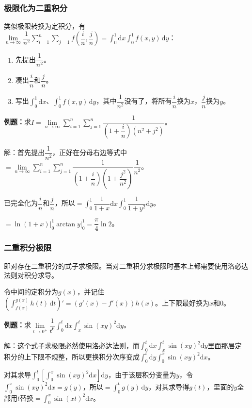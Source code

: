 \documentclass[UTF8, 12pt]{ctexart}
\begin{document}
\subsubsection{极限化为二重积分}

类似极限转换为定积分，有$\lim\limits_{n\to\infty}\dfrac{1}{n^2}\sum\limits_{i=1}^n\sum\limits_{j=1}f\left(\dfrac{i}{n},\dfrac{j}{n}\right)=\int_0^1\textrm{d}x\int_0^1f(x,y)\,\textrm{d}y$：

\begin{enumerate}
    \item 先提出$\dfrac{1}{n^2}$。
    \item 凑出$\dfrac{i}{n}$和$\dfrac{j}{n}$。
    \item 写出$\int_0^1\textrm{d}x$、$\int_0^1f(x,y)\,\textrm{d}y$，其中$\dfrac{1}{n^2}$没有了，将所有$\dfrac{i}{n}$换为$x$，$\dfrac{j}{n}$换为$y$。
\end{enumerate}

\textbf{例题：}求$I=\lim\limits_{n\to\infty}\sum\limits_{i=1}^n\sum\limits_{j=1}^n\dfrac{1}{\left(1+\dfrac{i}{n}\right)(n^2+j^2)}$。

解：首先提出$\dfrac{1}{n^2}$，正好在分母右边等式中$=\lim\limits_{n\to\infty}\sum\limits_{i=1}^n\sum\limits_{j=1}^n\dfrac{1}{\left(1+\dfrac{i}{n}\right)(1+\dfrac{j^2}{n^2})}\dfrac{1}{n^2}$。

已完全化为$\dfrac{i}{n}$和$\dfrac{j}{n}$，所以$=\displaystyle{\int_0^1\dfrac{1}{1+x}\textrm{d}x\int_0^1\dfrac{1}{1+y^2}\textrm{d}y}$。

$=\ln(1+x)\vert_0^1\arctan y\vert_0^1=\dfrac{\pi}{4}\ln2$。

\subsubsection{二重积分极限}

即对存在二重积分的式子求极限。当对二重积分求极限时基本上都需要使用洛必达法则对积分求导。

令中间的定积分为$g(x)$，并记住$(\int_{f(x)}^{g(x)}h(t)\,\textrm{d}t)'=(g'(x)-f'(x))h(x)$。上下限最好换为$x$和$0$。

\textbf{例题：}求$\lim\limits_{t\to0^+}\dfrac{1}{t^6}\int_0^t\textrm{d}x\int_x^t\sin(xy)^2\textrm{d}y$。

解：这个式子求极限必然使用洛必达法则，而$\int_0^t\textrm{d}x\int_x^t\sin(xy)^2\textrm{d}y$里面那层定积分的上下限不规整，所以更换积分次序变成$\int_0^t\textrm{d}y\int_0^x\sin(xy)^2\textrm{d}x$。

对其求导$\int_0^t[\int_0^x\sin(xy)^2\textrm{d}x]\textrm{d}y$，由于该层积分变量为$y$，令$\int_0^x\sin(xy)^2\textrm{d}x=g(y)$，所以$=\int_0^tg(y)\,\textrm{d}y$，对其求导得$g(t)$，里面的$y$全部用$t$替换$=\int_0^x\sin(xt)^2\textrm{d}x$。
\end{document}

